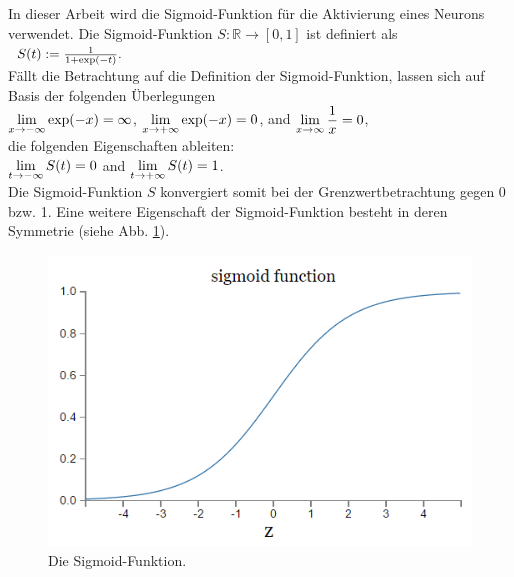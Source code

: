 \noindent
In dieser Arbeit wird die Sigmoid-Funktion für die Aktivierung eines Neurons verwendet. Die Sigmoid-Funktion $S:\mathbb{R} \rightarrow [0,1]$ ist definiert als \\[0.2cm]
\hspace*{1.3cm}
$
\begin{array}[t]{lclll}
	S(t) := \frac{1}{1+\exp(-t)}.
\end{array}
$
\\[0.2cm]
Fällt die Betrachtung auf die Definition der Sigmoid-Funktion, lassen sich auf Basis der folgenden Überlegungen \\[0.2cm]
\hspace*{1.3cm}
$\displaystyle\lim\limits_{x\rightarrow
-\infty} \exp(-x) = \infty$, \quad 
$\displaystyle\lim\limits_{x\rightarrow+\infty} \exp(-x) = 0$, \quad and \quad
$\displaystyle\lim\limits_{x\rightarrow\infty} \frac{1}{x} = 0$, 
\\[0.2cm]
die folgenden Eigenschaften ableiten: \\[0.2cm]
\hspace*{1.3cm}
$\displaystyle \lim_{t\rightarrow-\infty} S(t) = 0$ \quad and \quad
$\displaystyle \lim_{t\rightarrow+\infty} S(t) = 1$.
\\[0.2cm]
Die Sigmoid-Funktion $S$ konvergiert somit bei der Grenzwertbetrachtung gegen 0 bzw. 1. Eine weitere Eigenschaft der Sigmoid-Funktion besteht in deren Symmetrie (siehe Abb. \ref{fig:sigmoid_plot}). 
\begin{figure}[hbt]
	\centering
	\includegraphics[scale=0.7]{Bilder/sigmoid_plot}
	\caption{Die Sigmoid-Funktion. \cite{nielson:2017}} 
	\label{fig:sigmoid_plot} 
\end{figure}

